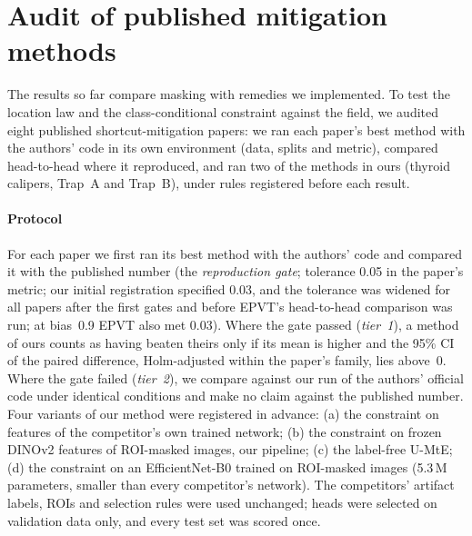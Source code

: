 \section{Audit of published mitigation methods}\label{sec:external}
The results so far compare masking with remedies we implemented. To test the location law and the class-conditional
constraint against the field, we audited eight published shortcut-mitigation papers: we ran each paper's best method with the
authors' code in its own environment (data, splits and metric), compared head-to-head where it reproduced, and ran
two of the methods in ours (thyroid calipers, Trap~A and Trap~B), under rules
registered before each result.

\paragraph{Protocol} For each paper we first ran its best method with the authors' code and compared it with the
published number (the \emph{reproduction gate}; tolerance 0.05 in the paper's metric; our initial registration specified 0.03, and the
tolerance was widened for all papers after the first gates and before EPVT's head-to-head comparison was run; at
bias~0.9 EPVT also met 0.03). Where the gate passed (\emph{tier~1}), a method of
ours counts as having beaten theirs only if its mean is higher and the 95\% CI of the paired difference, Holm-adjusted
within the paper's family, lies above~0. Where the gate failed (\emph{tier~2}), we compare against our run of the
authors' official code under identical conditions and make no claim against the published number. Four variants of our
method were registered in advance: (a) the constraint on features of the competitor's own trained network; (b) the
constraint on frozen DINOv2 features of ROI-masked images, our pipeline; (c) the label-free U-MtE; (d) the constraint on
an EfficientNet-B0 trained on ROI-masked images (5.3\,M parameters, smaller than every competitor's network). The
competitors' artifact labels, ROIs and selection rules were used unchanged; heads were selected on validation data only,
and every test set was scored once.

